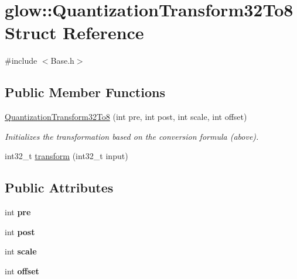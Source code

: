 \hypertarget{structglow_1_1_quantization_transform32_to8}{}\section{glow\+:\+:Quantization\+Transform32\+To8 Struct Reference}
\label{structglow_1_1_quantization_transform32_to8}


{\ttfamily \#include $<$Base.\+h$>$}

\subsection*{Public Member Functions}
\begin{DoxyCompactItemize}
\item 
\mbox{\label{structglow_1_1_quantization_transform32_to8_ad19aab74e564312114bb9eb32d7fad42}} 
\hyperlink{structglow_1_1_quantization_transform32_to8_ad19aab74e564312114bb9eb32d7fad42}{Quantization\+Transform32\+To8} (int pre, int post, int scale, int offset)
\begin{DoxyCompactList}\small\item\em Initializes the transformation based on the conversion formula (above). \end{DoxyCompactList}\item 
int32\+\_\+t \hyperlink{structglow_1_1_quantization_transform32_to8_ab48e7acc8ccd87e09423c7d08dfa0b5f}{transform} (int32\+\_\+t input)
\end{DoxyCompactItemize}
\subsection*{Public Attributes}
\begin{DoxyCompactItemize}
\item 
\mbox{\label{structglow_1_1_quantization_transform32_to8_a0cc44bc4961875eb28bccdec468ea434}} 
int {\bfseries pre}
\item 
\mbox{\label{structglow_1_1_quantization_transform32_to8_a2dfeec98ddd05264fccb9d40f26cd9c2}} 
int {\bfseries post}
\item 
\mbox{\label{structglow_1_1_quantization_transform32_to8_aceb549f45cc58b9151a8a50b05e9233d}} 
int {\bfseries scale}
\item 
\mbox{\label{structglow_1_1_quantization_transform32_to8_a25696ee5d2988d4b14a3174044d43b2e}} 
int {\bfseries offset}
\end{DoxyCompactItemize}


